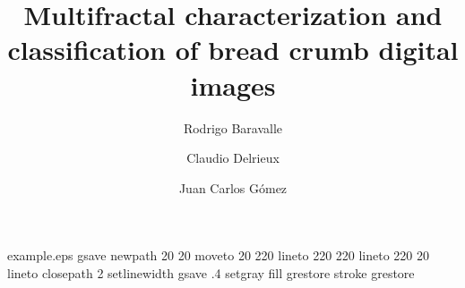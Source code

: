 %
%
%
%
%
\begin{filecontents*}{example.eps}
gsave
newpath
  20 20 moveto
  20 220 lineto
  220 220 lineto
  220 20 lineto
closepath
2 setlinewidth
gsave
  .4 setgray fill
grestore
stroke
grestore
\end{filecontents*}
%
\RequirePackage{fix-cm}
%
\documentclass[twocolumn]{svjour3}          %
%
\smartqed  %
%
\usepackage{graphicx}
\usepackage{amssymb}
%
%
%
%
%


\title{Multifractal characterization and classification of bread crumb digital images%
}


\author{Rodrigo Baravalle         \and
        Claudio Delrieux \and
        Juan Carlos G\'omez
}


